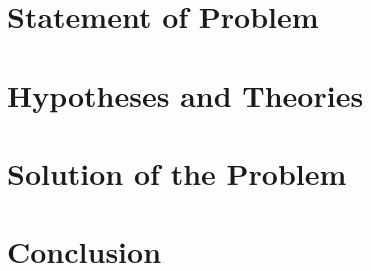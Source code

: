 \section{Statement of Problem}

\section{Hypotheses and Theories}



\section{Solution of the Problem}

\section{Conclusion}